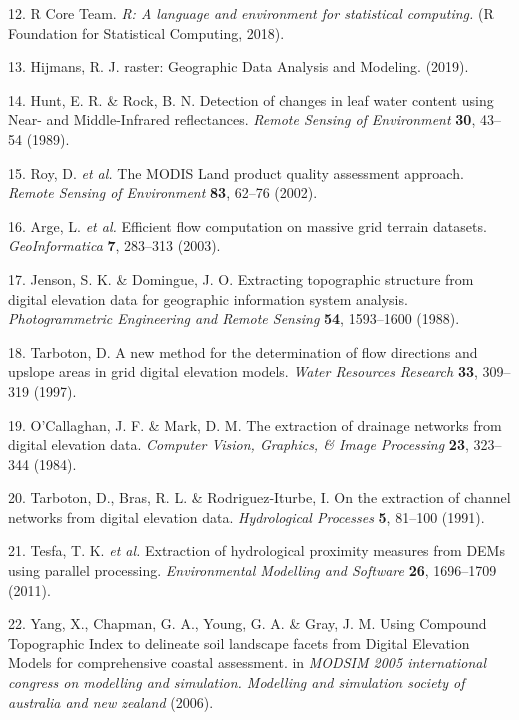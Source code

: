 \documentclass[12pt,oneside]{article}
\begin{document}
\leavevmode\hypertarget{ref-RCoreTeam_2018}{}%
12. R Core Team. \emph{R: A language and environment for statistical computing.} (R Foundation for Statistical Computing, 2018).

\leavevmode\hypertarget{ref-Hijmans_2019}{}%
13. Hijmans, R. J. raster: Geographic Data Analysis and Modeling. (2019).

\leavevmode\hypertarget{ref-Hunt_and_Rock_1989}{}%
14. Hunt, E. R. \& Rock, B. N. Detection of changes in leaf water content using Near- and Middle-Infrared reflectances. \emph{Remote Sensing of Environment} \textbf{30}, 43--54 (1989).

\leavevmode\hypertarget{ref-Roy_et_al_2002}{}%
15. Roy, D. \emph{et al.} The MODIS Land product quality assessment approach. \emph{Remote Sensing of Environment} \textbf{83}, 62--76 (2002).

\leavevmode\hypertarget{ref-Arge_et_al_2003}{}%
16. Arge, L. \emph{et al.} Efficient flow computation on massive grid terrain datasets. \emph{GeoInformatica} \textbf{7}, 283--313 (2003).

\leavevmode\hypertarget{ref-Jenson_and_Domingue_1988}{}%
17. Jenson, S. K. \& Domingue, J. O. Extracting topographic structure from digital elevation data for geographic information system analysis. \emph{Photogrammetric Engineering and Remote Sensing} \textbf{54}, 1593--1600 (1988).

\leavevmode\hypertarget{ref-Tarboton_1997}{}%
18. Tarboton, D. A new method for the determination of flow directions and upslope areas in grid digital elevation models. \emph{Water Resources Research} \textbf{33}, 309--319 (1997).

\leavevmode\hypertarget{ref-OCallaghan_Mark_1984}{}%
19. O'Callaghan, J. F. \& Mark, D. M. The extraction of drainage networks from digital elevation data. \emph{Computer Vision, Graphics, \& Image Processing} \textbf{23}, 323--344 (1984).

\leavevmode\hypertarget{ref-Tarboton_et_al_1991}{}%
20. Tarboton, D., Bras, R. L. \& Rodriguez‐Iturbe, I. On the extraction of channel networks from digital elevation data. \emph{Hydrological Processes} \textbf{5}, 81--100 (1991).

\leavevmode\hypertarget{ref-Tesfa_et_al_2011}{}%
21. Tesfa, T. K. \emph{et al.} Extraction of hydrological proximity measures from DEMs using parallel processing. \emph{Environmental Modelling and Software} \textbf{26}, 1696--1709 (2011).

\leavevmode\hypertarget{ref-Yang_et_al_2006}{}%
22. Yang, X., Chapman, G. A., Young, G. A. \& Gray, J. M. Using Compound Topographic Index to delineate soil landscape facets from Digital Elevation Models for comprehensive coastal assessment. in \emph{MODSIM 2005 international congress on modelling and simulation. Modelling and simulation society of australia and new zealand} (2006).
\end{document}

